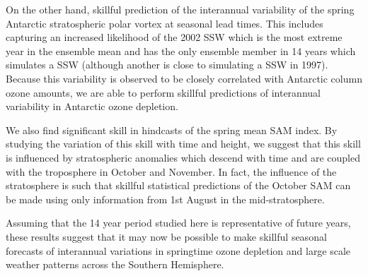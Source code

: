 On the other hand, skillful prediction of the interannual variability of the
spring Antarctic stratospheric polar vortex at seasonal lead times. This
includes capturing an increased likelihood of the 2002 SSW which is the most
extreme year in the ensemble mean and has the only ensemble member in 14 years
which simulates a SSW (although another is close to simulating a SSW in
1997). Because this variability is observed to be closely correlated with
Antarctic column ozone amounts, we are able to perform skillful predictions of
interannual variability in Antarctic ozone depletion.

We also find significant skill in hindcasts of the spring mean SAM index.  By
studying the variation of this skill with time and height, we suggest that this
skill is influenced by stratospheric anomalies which descend with time and are
coupled with the troposphere in October and November. In fact, the influence of
the stratosphere is such that skillful statistical predictions of the October
SAM can be made using only information from 1st August in the mid-stratosphere.

Assuming that the 14 year period studied here is representative of future years,
these results suggest that it may now be possible to make skillful seasonal
forecasts of interannual variations in springtime ozone depletion and large
scale weather patterns across the Southern Hemisphere.




\pagebreak

